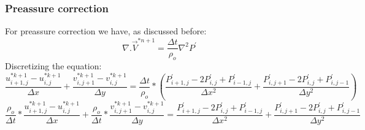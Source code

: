 \documentclass[xcolor=dvipsnames,10pt,aspectratio=169]{beamer}
\begin{document}
\begin{frame}
	\frametitle{Preassure correction}
	For preassure correction we have, as discussed before:
	\begin{equation}
		\nabla .\vec{V}^{\ast{n + 1}} = \frac{\Delta t}{\rho_o} \nabla^2 P^\prime
	\end{equation}
	Discretizing the equation:
	\begin{equation}
		\frac{u_{i + 1 , j}^{\ast k + 1} - u_{i , j}^{\ast k + 1}}{\Delta x} + \frac{v_{i , j + 1}^{\ast k + 1} - v_{i , j}^{\ast k + 1}}{\Delta y} = \frac{\Delta t}{\rho_o} * \left( \frac{ P^{\prime}_{i + 1, j} - 2 P^{\prime}_{i , j} + P^{\prime}_{i - 1 , j} }{\Delta x^2} + \frac{ P^{\prime}_{i, j + 1} - 2 P^{\prime}_{i , j} + P^{\prime}_{i , j- 1} }{\Delta y^2} \right)
	\end{equation}
	\begin{equation}
	\frac{\rho_o}{ \Delta t} * \frac{u_{i + 1 , j}^{\ast k + 1} - u_{i , j}^{\ast k + 1}}{\Delta x} + \frac{\rho_o}{ \Delta t} * \frac{v_{i , j + 1}^{\ast k + 1} - v_{i , j}^{\ast k + 1}}{\Delta y} =  \frac{ P^{\prime}_{i + 1, j} - 2 P^{\prime}_{i , j} + P^{\prime}_{i - 1 , j} }{\Delta x^2} + \frac{ P^{\prime}_{i, j + 1} - 2 P^{\prime}_{i , j} + P^{\prime}_{i , j- 1} }{\Delta y^2}
	\end{equation}
\end{frame}
\end{document}
